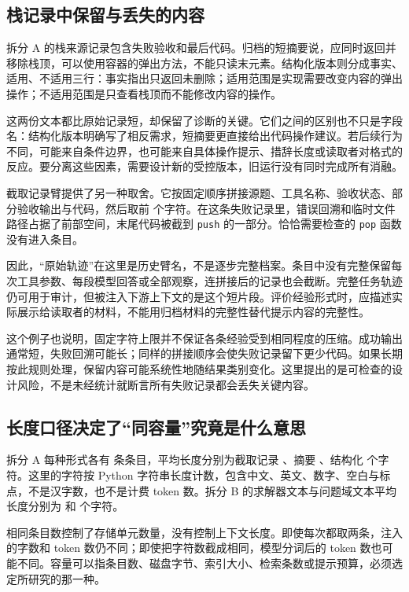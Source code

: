 \subsection{栈记录中保留与丢失的内容}

拆分 A 的栈来源记录包含失败验收和最后代码。归档的短摘要说，应同时返回并移除栈顶，可以使用容器的弹出方法，不能只读末元素。结构化版本则分成事实、适用、不适用三行：事实指出只返回未删除；适用范围是实现需要改变内容的弹出操作；不适用范围是只查看栈顶而不能修改内容的操作。

这两份文本都比原始记录短，却保留了诊断的关键。它们之间的区别也不只是字段名：结构化版本明确写了相反需求，短摘要更直接给出代码操作建议。若后续行为不同，可能来自条件边界，也可能来自具体操作提示、措辞长度或读取者对格式的反应。要分离这些因素，需要设计新的受控版本，旧运行没有同时完成所有消融。

截取记录臂提供了另一种取舍。它按固定顺序拼接源题、工具名称、验收状态、部分验收输出与代码，然后取前  个字符。在这条失败记录里，错误回溯和临时文件路径占据了前部空间，末尾代码被截到 \texttt{push} 的一部分。恰恰需要检查的 \texttt{pop} 函数没有进入条目。

因此，“原始轨迹”在这里是历史臂名，不是逐步完整档案。条目中没有完整保留每次工具参数、每段模型回答或全部观察，连拼接后的记录也会截断。完整任务轨迹仍可用于审计，但被注入下游上下文的是这个短片段。评价经验形式时，应描述实际展示给读取者的材料，不能用归档材料的完整性替代提示内容的完整性。

这个例子也说明，固定字符上限并不保证各条经验受到相同程度的压缩。成功输出通常短，失败回溯可能长；同样的拼接顺序会使失败记录留下更少代码。如果长期按此规则处理，保留内容可能系统性地随结果类别变化。这里提出的是可检查的设计风险，不是未经统计就断言所有失败记录都会丢失关键内容。

\subsection{长度口径决定了“同容量”究竟是什么意思}

拆分 A 每种形式各有  条条目，平均长度分别为截取记录 、摘要 、结构化  个字符。这里的字符按 Python 字符串长度计数，包含中文、英文、数字、空白与标点，不是汉字数，也不是计费 token 数。拆分 B 的求解器文本与问题域文本平均长度分别为  和  个字符。

相同条目数控制了存储单元数量，没有控制上下文长度。即使每次都取两条，注入的字数和 token 数仍不同；即使把字符数截成相同，模型分词后的 token 数也可能不同。容量可以指条目数、磁盘字节、索引大小、检索条数或提示预算，必须选定所研究的那一种。

